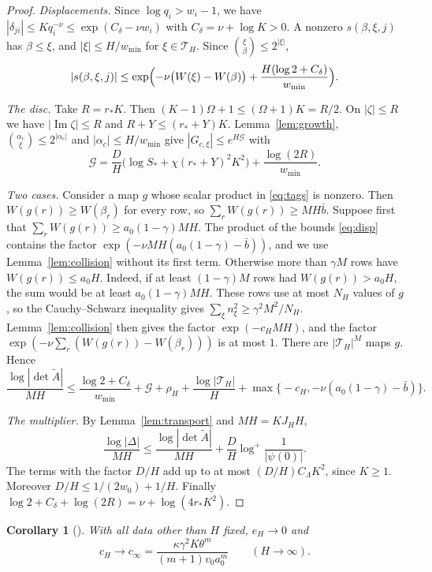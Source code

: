 \documentclass[11pt]{amsart}
\newtheorem{corollary}[theorem]{Corollary}
\theoremstyle{definition}
\theoremstyle{remark}
\numberwithin{equation}{section}
\newcommand{\cT}{\mathcal T}
\newcommand{\cG}{\mathcal G}
\newcommand{\tA}{\widetilde A}
\newcommand{\bb}{\bar b}
\begin{document}
\begin{proof}
\emph{Displacements.} Since $\log q_i>w_i-1$, we have $|\delta_{ji}|\le Kq_i^{-\nu}\le\exp(C_\delta-\nu w_i)$
with $C_\delta=\nu+\log K>0$. A nonzero $s(\beta,\xi,j)$ has $\beta\le\xi$, and $|\xi|\le H/w_{\min}$ for
$\xi\in\cT_H$. Since $\binom\xi\beta\le2^{|\xi|}$,
\begin{equation}\label{eq:disp}
 |s(\beta,\xi,j)|\le\exp\Bigl(-\nu\bigl(W(\xi)-W(\beta)\bigr)+\frac{H(\log2+C_\delta)}{w_{\min}}\Bigr).
\end{equation}

\emph{The disc.} Take $R=r_*K$. Then $(K-1)\Omega+1\le(\Omega+1)K=R/2$. On $|\zeta|\le R$ we have
$|\operatorname{Im}\zeta|\le R$ and $R+Y\le(r_*+Y)K$. Lemma~\ref{lem:growth}, $\binom{\alpha_c}\xi\le2^{|\alpha_c|}$
and $|\alpha_c|\le H/w_{\min}$ give $|G_{c,\xi}|\le e^{H\cG}$ with
\[
 \cG=\frac DH\bigl(\log S_*+\chi(r_*+Y)^2K^2\bigr)+\frac{\log(2R)}{w_{\min}}.
\]

\emph{Two cases.} Consider a map $g$ whose scalar product in \eqref{eq:tags} is nonzero. Then
$W(g(r))\ge W(\beta_r)$ for every row, so $\sum_rW(g(r))\ge MH\bb$. Suppose first that
$\sum_rW(g(r))\ge a_0(1-\gamma)MH$. The product of the bounds \eqref{eq:disp} contains the factor
$\exp(-\nu MH(a_0(1-\gamma)-\bb))$, and we use Lemma~\ref{lem:collision} without its first term. Otherwise
more than $\gamma M$ rows have $W(g(r))\le a_0H$. Indeed, if at least $(1-\gamma)M$ rows had $W(g(r))>a_0H$,
the sum would be at least $a_0(1-\gamma)MH$. These rows use at most $N_H$ values of $g$, so the
Cauchy--Schwarz inequality gives $\sum_\xi n_\xi^2\ge\gamma^2M^2/N_H$. Lemma~\ref{lem:collision} then gives the
factor $\exp(-c_HMH)$, and the factor $\exp(-\nu\sum_r(W(g(r))-W(\beta_r)))$ is at most $1$. There are
$|\cT_H|^M$ maps $g$. Hence
\[
 \frac{\log|\det\tA|}{MH}\le\frac{\log2+C_\delta}{w_{\min}}+\cG+\rho_H+\frac{\log|\cT_H|}H
 +\max\bigl\{-c_H,-\nu(a_0(1-\gamma)-\bb)\bigr\}.
\]

\emph{The multiplier.} By Lemma~\ref{lem:transport} and $MH=KJ_HH$,
\[
 \frac{\log|\Delta|}{MH}\le\frac{\log|\det\tA|}{MH}+\frac DH\log^+\frac1{|\psi(0)|}.
\]
The terms with the factor $D/H$ add up to at most $(D/H)C_\Lambda K^2$, since $K\ge1$. Moreover
$D/H\le1/(2w_0)+1/H$. Finally $\log2+C_\delta+\log(2R)=\nu+\log(4r_*K^2)$.
\end{proof}

\begin{corollary}[{\cite[Corollary~16.4]{ChudnovskyChudnovsky26}}]\label{cor:limits}
With all data other than $H$ fixed, $e_H\to0$ and
\[
 c_H\to c_\infty=\frac{\kappa\gamma^2K\theta^m}{(m+1)v_0a_0^m}\qquad(H\to\infty).
\]
\end{corollary}
\end{document}
